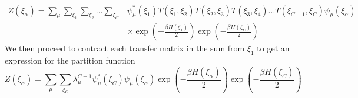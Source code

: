 %
\begin{align}
Z\left(\xi_{\alpha}\right)=\sum_{\mu}\sum_{\xi_1}\sum_{\xi_2}...\sum_{\xi_C}&\psi_{\mu}^{*}\left(\xi_{1} \right)T\left(\xi_1,\xi_2\right)T\left(\xi_2,\xi_3\right)T\left(\xi_3,\xi_4\right)...T\left(\xi_{C-1},\xi_C\right)\psi_{\mu}\left(\xi_{\alpha}\right)\\
&\times\exp\left(-\frac{\beta H\left( \xi_1\right)}{2}\right)\exp\left(-\frac{\beta H\left( \xi_C\right)}{2}\right)\nonumber
\end{align}
%
We then proceed to contract each transfer matrix in the sum from $\xi_1$ to get an expression for the partition function
%
\begin{equation}
Z\left(\xi_{\alpha}\right)=\sum_{\mu}\sum_{\xi_C}\lambda_{\mu}^{C-1}\psi_{\mu}^{*}\left(\xi_{C} \right)\psi_{\mu}\left(\xi_{\alpha}\right)\exp\left(-\frac{\beta H\left( \xi_{\alpha}\right)}{2}\right)\exp\left(-\frac{\beta H\left( \xi_C\right)}{2}\right)
\end{equation}


